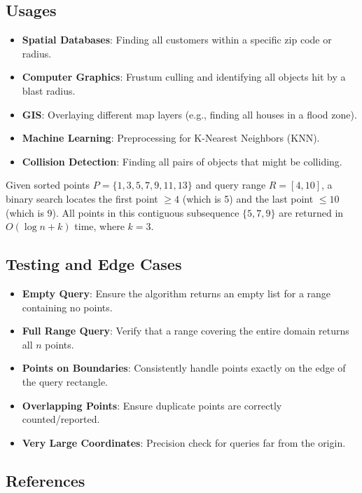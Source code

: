 \subsection{Usages}

\begin{itemize}
\item \textbf{Spatial Databases}: Finding all customers within a specific zip code or radius.
\item \textbf{Computer Graphics}: Frustum culling and identifying all objects hit by a blast radius.
\item \textbf{GIS}: Overlaying different map layers (e.g., finding all houses in a flood zone).
\item \textbf{Machine Learning}: Preprocessing for K-Nearest Neighbors (KNN).
\item \textbf{Collision Detection}: Finding all pairs of objects that might be colliding.
\end{itemize}

\begin{example}\label{ex:1d_range}
Given sorted points $P = \{1, 3, 5, 7, 9, 11, 13\}$ and query range $R = [4, 10]$, a binary search locates the first point $\ge 4$ (which is 5) and the last point $\le 10$ (which is 9). All points in this contiguous subsequence $\{5, 7, 9\}$ are returned in $O(\log n + k)$ time, where $k = 3$.
\end{example}

\subsection{Testing and Edge Cases}

\begin{itemize}
\item \textbf{Empty Query}: Ensure the algorithm returns an empty list for a range containing no points.
\item \textbf{Full Range Query}: Verify that a range covering the entire domain returns all $n$ points.
\item \textbf{Points on Boundaries}: Consistently handle points exactly on the edge of the query rectangle.
\item \textbf{Overlapping Points}: Ensure duplicate points are correctly counted/reported.
\item \textbf{Very Large Coordinates}: Precision check for queries far from the origin.
\end{itemize}

\subsection{References}

